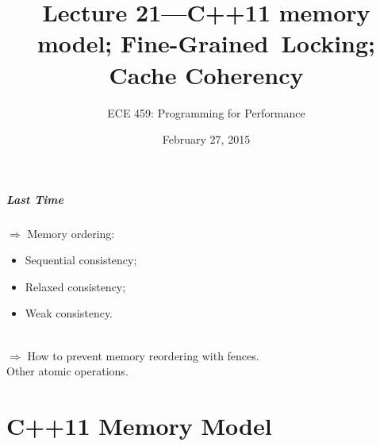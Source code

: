 \documentclass[aspectratio=43]{beamer}
\title{Lecture 21---C++11 memory model; Fine-Grained~Locking; Cache Coherency}
\subtitle{ECE 459: Programming for Performance}
\date{February 27, 2015}
\newenvironment{changemargin}[1]{%
  \begin{list}{}{%
    \setlength{\topsep}{0pt}%
    \setlength{\leftmargin}{#1}%
    \setlength{\rightmargin}{1em}
    \setlength{\listparindent}{\parindent}%
    \setlength{\itemindent}{\parindent}%
    \setlength{\parsep}{\parskip}%
  }%
  \item[]}{\end{list}}
\begin{document}
\begin{frame}[plain]
  \titlepage
\end{frame}

\begin{frame}
  \frametitle{Last Time}
\begin{changemargin}{2cm}
 $\Rightarrow$ Memory ordering:
      \begin{itemize}
        \item Sequential consistency;
        \item Relaxed consistency;
        \item Weak consistency.
      \end{itemize}~\\

 $\Rightarrow$ How to prevent memory reordering with fences.\\[1em]

 Other atomic operations.

\end{changemargin}

\end{frame}


\part{C++11 Memory Model}
\frame{\partpage}
\end{document}
